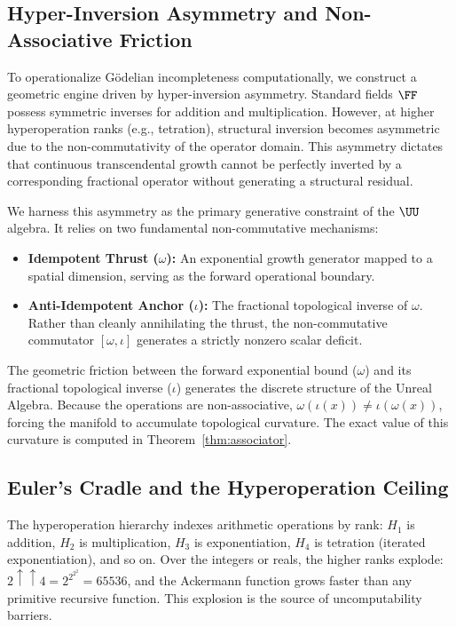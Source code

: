\subsection{Hyper-Inversion Asymmetry and Non-Associative Friction}

To operationalize G\"odelian incompleteness computationally, we construct a geometric engine driven by hyper-inversion asymmetry. Standard fields $\FF$ possess symmetric inverses for addition and multiplication. However, at higher hyperoperation ranks (e.g., tetration), structural inversion becomes asymmetric due to the non-commutativity of the operator domain. This asymmetry dictates that continuous transcendental growth cannot be perfectly inverted by a corresponding fractional operator without generating a structural residual.

We harness this asymmetry as the primary generative constraint of the $\UU$ algebra. It relies on two fundamental non-commutative mechanisms:
\begin{itemize}
\item \textbf{Idempotent Thrust ($\omega$):} An exponential growth generator mapped to a spatial dimension, serving as the forward operational boundary.
\item \textbf{Anti-Idempotent Anchor ($\iota$):} The fractional topological inverse of $\omega$. Rather than cleanly annihilating the thrust, the non-commutative commutator $[\omega, \iota]$ generates a strictly nonzero scalar deficit.
\end{itemize}

The geometric friction between the forward exponential bound ($\omega$) and its fractional topological inverse ($\iota$) generates the discrete structure of the Unreal Algebra. Because the operations are non-associative, $\omega(\iota(x)) \neq \iota(\omega(x))$, forcing the manifold to accumulate topological curvature. The exact value of this curvature is computed in Theorem~\ref{thm:associator}.

\subsection{Euler's Cradle and the Hyperoperation Ceiling}\label{sec:euler-cradle}

The hyperoperation hierarchy indexes arithmetic operations by rank: $H_1$ is addition, $H_2$ is multiplication, $H_3$ is exponentiation, $H_4$ is tetration (iterated exponentiation), and so on. Over the integers or reals, the higher ranks explode: $2 \uparrow\uparrow 4 = 2^{2^{2^{2}}} = 65536$, and the Ackermann function grows faster than any primitive recursive function. This explosion is the source of uncomputability barriers.

